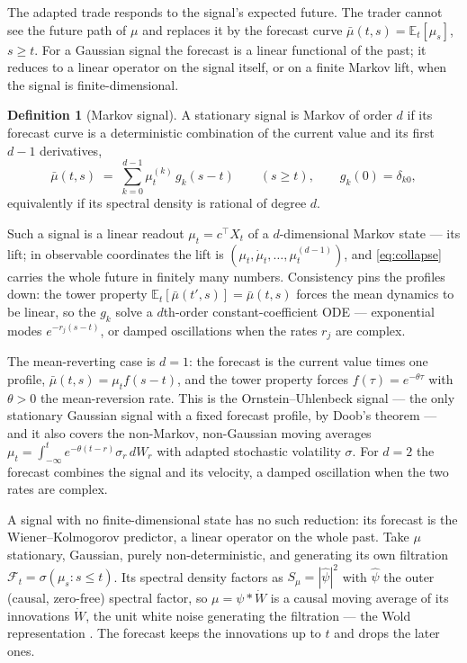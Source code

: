 \documentclass[11pt]{article}
\newcommand{\E}{\mathbb{E}}
\newcommand{\F}{\mathcal{F}}
\theoremstyle{plain}
\theoremstyle{definition}
\newtheorem{definition}{Definition}
\theoremstyle{remark}
\begin{document}
The adapted trade responds to the signal's expected future. The trader cannot see the future path of $\mu$ and replaces it by the forecast curve $\bar\mu(t,s)=\E_t[\mu_s]$, $s\ge t$. For a Gaussian signal the forecast is a linear functional of the past; it reduces to a linear operator on the signal itself, or on a finite Markov lift, when the signal is finite-dimensional.

\begin{definition}[Markov signal]\label{def:mr}
A stationary signal is Markov of order $d$ if its forecast curve is a deterministic combination of the current value and its first $d-1$ derivatives,
\begin{equation}\label{eq:collapse}
\bar\mu(t,s) \;=\; \sum_{k=0}^{d-1}\mu^{(k)}_t\,g_k(s-t)\qquad (s\ge t),\qquad g_k(0)=\delta_{k0},
\end{equation}
equivalently if its spectral density is rational of degree $d$.
\end{definition}

Such a signal is a linear readout $\mu_t=c^{\!\top}X_t$ of a $d$-dimensional Markov state --- its lift; in observable coordinates the lift is $(\mu_t,\dot\mu_t,\dots,\mu^{(d-1)}_t)$, and \eqref{eq:collapse} carries the whole future in finitely many numbers. Consistency pins the profiles down: the tower property $\E_t[\bar\mu(t',s)]=\bar\mu(t,s)$ forces the mean dynamics to be linear, so the $g_k$ solve a $d$th-order constant-coefficient ODE --- exponential modes $e^{-r_j(s-t)}$, or damped oscillations when the rates $r_j$ are complex.

The mean-reverting case is $d=1$: the forecast is the current value times one profile, $\bar\mu(t,s)=\mu_t f(s-t)$, and the tower property forces $f(\tau)=e^{-\theta\tau}$ with $\theta>0$ the mean-reversion rate. This is the Ornstein--Uhlenbeck signal --- the only stationary Gaussian signal with a fixed forecast profile, by Doob's theorem --- and it also covers the non-Markov, non-Gaussian moving averages $\mu_t=\int_{-\infty}^t e^{-\theta(t-r)}\sigma_r\,dW_r$ with adapted stochastic volatility $\sigma$. For $d=2$ the forecast combines the signal and its velocity, a damped oscillation when the two rates are complex.

A signal with no finite-dimensional state has no such reduction: its forecast is the Wiener--Kolmogorov predictor, a linear operator on the whole past. Take $\mu$ stationary, Gaussian, purely non-deterministic, and generating its own filtration $\F_t=\sigma(\mu_s:s\le t)$. Its spectral density factors as $S_\mu=|\hat\psi|^2$ with $\hat\psi$ the outer (causal, zero-free) spectral factor, so $\mu=\psi\ast\dot W$ is a causal moving average of its innovations $\dot W$, the unit white noise generating the filtration --- the Wold representation \citep{Wiener1949,Whittle1963}. The forecast keeps the innovations up to $t$ and drops the later ones.
\end{document}
